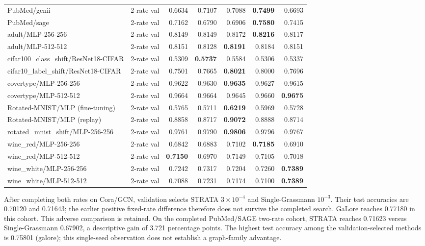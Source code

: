 \begin{table}[t]
\begin{adjustbox}{max width=\linewidth}
\begin{tabular}{llrrrrr}
PubMed/gcnii & 2-rate val & \cellcolor{oursbg}0.6634 & 0.7107 & 0.7088 & \textbf{0.7499} & 0.6693 \\
PubMed/sage & 2-rate val & \cellcolor{oursbg}0.7162 & 0.6790 & 0.6906 & \textbf{0.7580} & 0.7415 \\
adult/MLP-256-256 & 2-rate val & \cellcolor{oursbg}0.8149 & 0.8149 & 0.8172 & \textbf{0.8216} & 0.8117 \\
adult/MLP-512-512 & 2-rate val & \cellcolor{oursbg}0.8151 & 0.8128 & \textbf{0.8191} & 0.8184 & 0.8151 \\
cifar100\_class\_shift/ResNet18-CIFAR & 2-rate val & \cellcolor{oursbg}0.5309 & \textbf{0.5737} & 0.5584 & 0.5306 & 0.5337 \\
cifar10\_label\_shift/ResNet18-CIFAR & 2-rate val & \cellcolor{oursbg}0.7501 & 0.7665 & \textbf{0.8021} & 0.8000 & 0.7696 \\
covertype/MLP-256-256 & 2-rate val & \cellcolor{oursbg}0.9622 & 0.9630 & \textbf{0.9635} & 0.9627 & 0.9615 \\
covertype/MLP-512-512 & 2-rate val & \cellcolor{oursbg}0.9664 & 0.9664 & 0.9645 & 0.9660 & \textbf{0.9675} \\
Rotated-MNIST/MLP (fine-tuning) & 2-rate val & \cellcolor{oursbg}0.5765 & 0.5711 & \textbf{0.6219} & 0.5969 & 0.5728 \\
Rotated-MNIST/MLP (replay) & 2-rate val & \cellcolor{oursbg}0.8858 & 0.8717 & \textbf{0.9072} & 0.8888 & 0.8714 \\
rotated\_mnist\_shift/MLP-256-256 & 2-rate val & \cellcolor{oursbg}0.9761 & 0.9790 & \textbf{0.9806} & 0.9796 & 0.9767 \\
wine\_red/MLP-256-256 & 2-rate val & \cellcolor{oursbg}0.6842 & 0.6883 & 0.7102 & \textbf{0.7185} & 0.6910 \\
wine\_red/MLP-512-512 & 2-rate val & \cellcolor{oursbg}\textbf{0.7150} & 0.6970 & 0.7149 & 0.7105 & 0.7018 \\
wine\_white/MLP-256-256 & 2-rate val & \cellcolor{oursbg}0.7242 & 0.7317 & 0.7204 & 0.7260 & \textbf{0.7389} \\
wine\_white/MLP-512-512 & 2-rate val & \cellcolor{oursbg}0.7088 & 0.7231 & 0.7174 & 0.7100 & \textbf{0.7389} \\
\bottomrule\end{tabular}
\end{adjustbox}\end{table}
After completing both rates on Cora/GCN, validation selects STRATA $3\times10^{-4}$ and Single-Grassmann $10^{-3}$. Their test accuracies are 0.70120 and 0.71643; the earlier positive fixed-rate difference therefore does not survive the completed search. GaLore reaches 0.77180 in this cohort. This adverse comparison is retained.
On the completed PubMed/SAGE two-rate cohort, STRATA reaches 0.71623 versus Single-Grassmann 0.67902, a descriptive gain of 3.721 percentage points. The highest test accuracy among the validation-selected methods is 0.75801 (galore); this single-seed observation does not establish a graph-family advantage.
